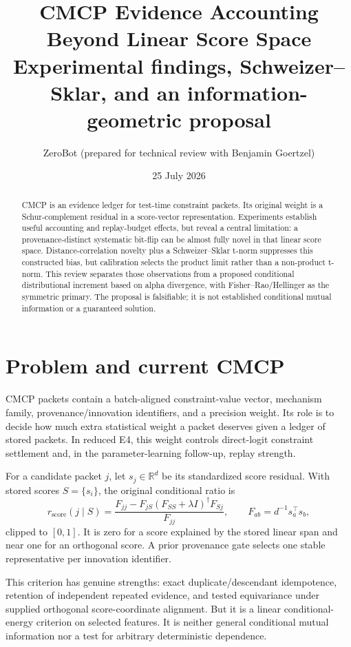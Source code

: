 \documentclass[11pt]{article}
\title{CMCP Evidence Accounting Beyond Linear Score Space\\\large Experimental findings, Schweizer--Sklar, and an information-geometric proposal}
\author{ZeroBot (prepared for technical review with Benjamin Goertzel)}
\date{25 July 2026}
\begin{document}
\sloppy
\maketitle
\begin{abstract}
CMCP is an evidence ledger for test-time constraint packets. Its original weight is a Schur-complement residual in a score-vector representation. Experiments establish useful accounting and replay-budget effects, but reveal a central limitation: a provenance-distinct systematic bit-flip can be almost fully novel in that linear score space. Distance-correlation novelty plus a Schweizer--Sklar t-norm suppresses this constructed bias, but calibration selects the product limit rather than a non-product t-norm. This review separates those observations from a proposed conditional distributional increment based on alpha divergence, with Fisher--Rao/Hellinger as the symmetric primary. The proposal is falsifiable; it is not established conditional mutual information or a guaranteed solution.
\end{abstract}

\section{Problem and current CMCP}
CMCP packets contain a batch-aligned constraint-value vector, mechanism family, provenance/innovation identifiers, and a precision weight. Its role is to decide how much extra statistical weight a packet deserves given a ledger of stored packets. In reduced E4, this weight controls direct-logit constraint settlement and, in the parameter-learning follow-up, replay strength.

For a candidate packet $j$, let $s_j\in\mathbb{R}^d$ be its standardized score residual. With stored scores $S=\{s_i\}$, the original conditional ratio is
\begin{equation}
r_{\mathrm{score}}(j\mid S)=
\frac{F_{jj}-F_{jS}(F_{SS}+\lambda I)^\dagger F_{Sj}}{F_{jj}},
\qquad F_{ab}=d^{-1}s_a^\top s_b,
\label{eq:schur}
\end{equation}
clipped to $[0,1]$. It is zero for a score explained by the stored linear span and near one for an orthogonal score. A prior provenance gate selects one stable representative per innovation identifier.

This criterion has genuine strengths: exact duplicate/descendant idempotence, retention of independent repeated evidence, and tested equivariance under supplied orthogonal score-coordinate alignment. But it is a linear conditional-energy criterion on selected features. It is neither general conditional mutual information nor a test for arbitrary deterministic dependence.
\end{document}
